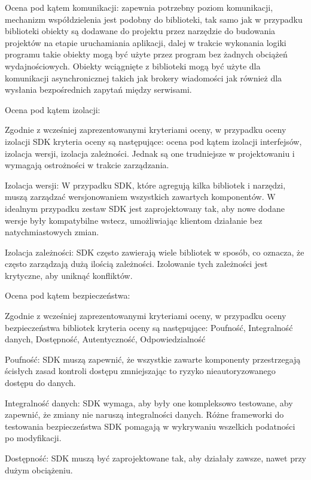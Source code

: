 \documentclass[runningheads,12pt]{llncs}
\begin{document}
Ocena pod kątem komunikacji: zapewnia potrzebny poziom komunikacji, mechanizm współdzielenia jest podobny do biblioteki, tak samo jak w przypadku biblioteki obiekty są dodawane do projektu przez narzędzie do budowania projektów na etapie uruchamiania aplikacji, dalej w trakcie wykonania logiki programu takie obiekty mogą być użyte przez program bez żadnych obciążeń wydajnościowych. Obiekty wciągnięte z biblioteki mogą być użyte dla komunikacji asynchronicznej takich jak brokery wiadomości jak również dla wysłania bezpośrednich zapytań między serwisami.

Ocena pod kątem izolacji:

Zgodnie z wcześniej zaprezentowanymi kryteriami oceny, w przypadku oceny izolacji SDK kryteria oceny są następujące: ocena pod kątem izolacji interfejsów, izolacja wersji, izolacja zależności. Jednak są one trudniejsze w projektowaniu i wymagają ostrożności w trakcie zarządzania. ~\cite[p. 75]{EssentialIan}

Izolacja wersji: W przypadku SDK, które agregują kilka bibliotek i narzędzi, muszą zarządzać wersjonowaniem wszystkich zawartych komponentów. W idealnym przypadku zestaw SDK jest zaprojektowany tak, aby nowe dodane wersje były kompatybilne wstecz, umożliwiając klientom działanie bez natychmiastowych zmian.

Izolacja zależności: SDK często zawierają wiele bibliotek w sposób, co oznacza, że często zarządzają dużą ilością zależności. Izolowanie tych zależności jest krytyczne, aby uniknąć konfliktów. ~\cite[p. 218]{martin2008clean}

Ocena pod kątem bezpieczeństwa:

Zgodnie z wcześniej zaprezentowanymi kryteriami oceny, w przypadku oceny bezpieczeństwa bibliotek kryteria oceny są następujące: Poufność, Integralność danych, Dostępność, Autentyczność, Odpowiedzialność

Poufność: SDK muszą zapewnić, że wszystkie zawarte komponenty przestrzegają ścisłych zasad kontroli dostępu zmniejszając to ryzyko nieautoryzowanego dostępu do danych.  ~\cite[para 4]{azure2020}

Integralność danych: SDK wymaga, aby były one kompleksowo testowane, aby zapewnić, że zmiany nie naruszą integralności danych. Różne frameworki do testowania bezpieczeństwa SDK pomagają w wykrywaniu wszelkich podatności po modyfikacji.  ~\cite[para 5]{azure2020}

Dostępność: SDK muszą być zaprojektowane tak, aby działały zawsze, nawet przy dużym obciążeniu. ~\cite[para 6]{azure2020}
\end{document}
